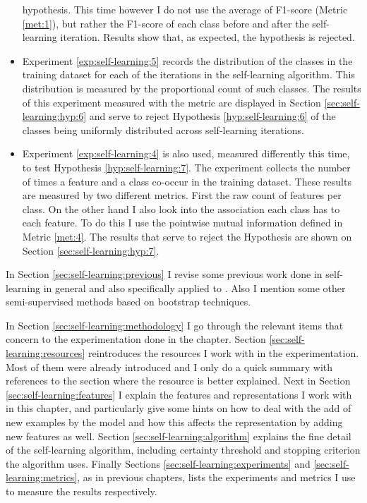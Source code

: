 \begin{itemize}
    hypothesis. This time however I do not use the average of F1-score (Metric
    \ref{met:1}), but rather the F1-score of each class before and after the
    self-learning iteration. Results show that, as expected, the hypothesis is
    rejected.
  \item Experiment \ref{exp:self-learning:5} records the distribution of the
    classes in the training dataset for each of the iterations in the
    self-learning algorithm. This distribution is measured by the proportional
    count of such classes. The results of this experiment measured with the
    metric are displayed in Section \ref{sec:self-learning:hyp:6} and serve to
    reject Hypothesis \ref{hyp:self-learning:6} of the classes being uniformly
    distributed across self-learning iterations.
  \item Experiment \ref{exp:self-learning:4} is also used, measured differently
    this time, to test Hypothesis \ref{hyp:self-learning:7}. The experiment
    collects the number of times a feature and a class co-occur in the training
    dataset. These results are measured by two different metrics. First the raw
    count of features per class. On the other hand I also look into the
    association each class has to each feature. To do this I use the pointwise
    mutual information defined in Metric \ref{met:4}. The results that serve to
    reject the Hypothesis are shown on Section \ref{sec:self-learning:hyp:7}.
\end{itemize}

In Section \ref{sec:self-learning:previous} I revise some previous work done in
self-learning in general and also specifically applied to \vsd. Also I mention
some other semi-supervised methods based on bootstrap techniques.

In Section \ref{sec:self-learning:methodology} I go through the relevant items
that concern to the experimentation done in the chapter. Section
\ref{sec:self-learning:resources} reintroduces the resources I work with in the
experimentation. Most of them were already introduced and I only do a quick
summary with references to the section where the resource is better explained.
Next in Section \ref{sec:self-learning:features} I explain the features and
representations I work with in this chapter, and particularly give some hints
on how to deal with the add of new examples by the model and how this affects
the representation by adding new features as well. Section
\ref{sec:self-learning:algorithm} explains the fine detail of the self-learning
algorithm, including certainty threshold and stopping criterion the algorithm
uses. Finally Sections \ref{sec:self-learning:experiments} and
\ref{sec:self-learning:metrics}, as in previous chapters, lists the experiments
and metrics I use to measure the results respectively.

